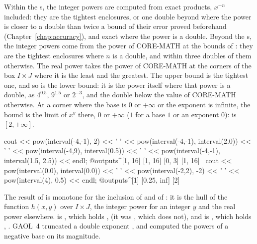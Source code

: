 \noindent
Within the s, the integer powers are computed from exact products,
  $x^{-n}$ included: they are the tightest enclosures, or one double beyond
  where the power is closer to a double than twice a bound of their error
  proved beforehand (Chapter~\ref{chap:accuracy}), and exact where the power
  is a double. Beyond the s, the integer powers come from the power of
  CORE-MATH at the bounds of : they are the tightest enclosures where
  $n$ is a double, and within three doubles of them
  otherwise.\newinvfive{} The real power takes the power of CORE-MATH at the
  corners of the box $I\times J$ where it is the least and the greatest. The
  upper bound is the tightest one, and so is the lower bound: it is the power
  itself where that power is a double, as $4^{0.5}$, $9^{1.5}$ or $2^{-3}$,
  and the double below the value of CORE-MATH otherwise. At a corner where
  the base is $0$ or $+\infty$ or the exponent is infinite, the bound is the
  limit of $x^y$ there, $0$ or $+\infty$ ($1$ for a base $1$ or an exponent
  $0$):  is $[2, +\infty]$.\newinvfive
\begin{example}
cout << pow(interval(-4,-1), 2) << ' '
     << pow(interval(-4,-1), interval(2.0)) << ' '
     << pow(interval(-4,9), interval(0.5)) << ' '
     << pow(interval(-4,-1), interval(1.5, 2.5)) << endl;
@outputs^[1, 16] [1, 16] [0, 3] [1, 16]~
cout << pow(interval(0.0), interval(0.0)) << ' '
     << pow(interval(-2,2), -2) << ' '
     << pow(interval(4), 0.5) << endl;
@outputs^[1] [0.25, inf] [2]~
\end{example}

\begin{Rem}\label{rem:arithmetic-pow-monotone}
The result of  is monotone for the inclusion of  and of
: it is the hull of the function $h(x,y)$ over $I\times J$, the integer
power for an integer $y$ and the real power elsewhere.\newinvfive{}
 is , which holds
,  (it was , which
does not), and  is , which holds
, . GAOL~4 truncated a double
exponent , and computed the powers of a negative base on its
magnitude.
\end{Rem}

